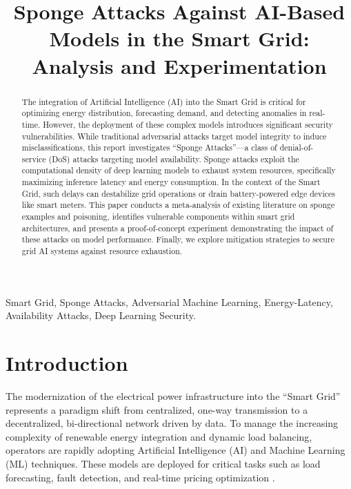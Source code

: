 \documentclass[conference]{IEEEtran}
\title{Sponge Attacks Against AI-Based Models in the Smart Grid: Analysis and Experimentation}
\author{\IEEEauthorblockN{Bora Pilav}
\IEEEauthorblockA{Institute for Automation and Applied Informatics (IAI)\\
Karlsruhe Institute of Technology\\
Karlsruhe, Germany\\
Email: ugglf@student.kit.edu}
}
\begin{document}
\maketitle

\begin{abstract}
The integration of Artificial Intelligence (AI) into the Smart Grid is critical for optimizing energy distribution, forecasting demand, and detecting anomalies in real-time. However, the deployment of these complex models introduces significant security vulnerabilities. While traditional adversarial attacks target model integrity to induce misclassifications, this report investigates ``Sponge Attacks''—a class of denial-of-service (DoS) attacks targeting model availability. Sponge attacks exploit the computational density of deep learning models to exhaust system resources, specifically maximizing inference latency and energy consumption. In the context of the Smart Grid, such delays can destabilize grid operations or drain battery-powered edge devices like smart meters. This paper conducts a meta-analysis of existing literature on sponge examples and poisoning, identifies vulnerable components within smart grid architectures, and presents a proof-of-concept experiment demonstrating the impact of these attacks on model performance. Finally, we explore mitigation strategies to secure grid AI systems against resource exhaustion.
\end{abstract}

\begin{IEEEkeywords}
Smart Grid, Sponge Attacks, Adversarial Machine Learning, Energy-Latency, Availability Attacks, Deep Learning Security.
\end{IEEEkeywords}

\IEEEpeerreviewmaketitle

\section{Introduction}
The modernization of the electrical power infrastructure into the ``Smart Grid'' represents a paradigm shift from centralized, one-way transmission to a decentralized, bi-directional network driven by data. To manage the increasing complexity of renewable energy integration and dynamic load balancing, operators are rapidly adopting Artificial Intelligence (AI) and Machine Learning (ML) techniques. These models are deployed for critical tasks such as load forecasting, fault detection, and real-time pricing optimization \cite{sanchez2024attacking}.
\end{document}
